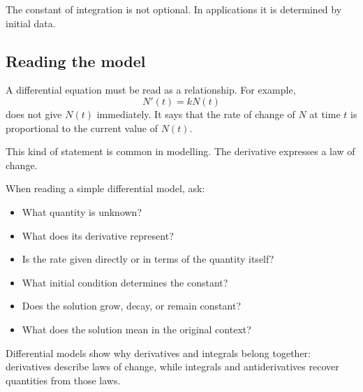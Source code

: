 The constant of integration is not optional. In applications it is determined by initial data.

\subsection*{Reading the model}

A differential equation must be read as a relationship. For example,
\[
N'(t)=kN(t)
\]
does not give \(N(t)\) immediately. It says that the rate of change of \(N\) at time \(t\) is proportional to the current value of \(N(t)\).

This kind of statement is common in modelling. The derivative expresses a law of change.

\begin{summarybox}
When reading a simple differential model, ask:
\begin{itemize}
\item What quantity is unknown?
\item What does its derivative represent?
\item Is the rate given directly or in terms of the quantity itself?
\item What initial condition determines the constant?
\item Does the solution grow, decay, or remain constant?
\item What does the solution mean in the original context?
\end{itemize}
\end{summarybox}

Differential models show why derivatives and integrals belong together: derivatives describe laws of change, while integrals and antiderivatives recover quantities from those laws.
